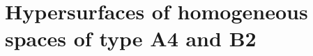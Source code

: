 \documentclass{amsart}
\theoremstyle{plain}
\newtheorem{corollary}{Corollary}
\theoremstyle{remark}
\newcommand\g{{\mathfrak{g}}}
\newcommand\m{{\mathfrak{m}}}
\begin{document}
{%
%	

\section{Hypersurfaces of homogeneous spaces of type \textbf{A4} and \textbf{B2}}
\setcounter{equation}{0}

}
\end{document}
